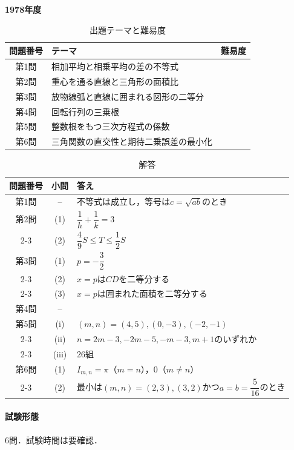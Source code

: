 \documentclass[../../main.tex]{subfiles}
\begin{document}
\begin{center}
  {\fontsize{48pt}{58pt}\selectfont \textbf{1978}\normalsize\textbf{年度}}
\end{center}

\begin{table}[htb]
  \centering
  \caption{出題テーマと難易度}
  \begin{tabular}{|c|p{9cm}|c|}
    \hline
    \textbf{問題番号} & \textbf{テーマ} & \textbf{難易度} \\
    \hline
    第1問 & 相加平均と相乗平均の差の不等式 & \\
    \hline
    第2問 & 重心を通る直線と三角形の面積比 & \\
    \hline
    第3問 & 放物線弧と直線に囲まれる図形の二等分 & \\
    \hline
    第4問 & 回転行列の三乗根 & \\
    \hline
    第5問 & 整数根をもつ三次方程式の係数 & \\
    \hline
    第6問 & 三角関数の直交性と期待二乗誤差の最小化 & \\
    \hline
  \end{tabular}
\end{table}

\begin{table}[htb]
  \centering
  \caption{解答}
  \renewcommand{\arraystretch}{1.4}
  \begin{tabular}{|c|c|p{9cm}|}
    \hline
    \textbf{問題番号} & \textbf{小問} & \textbf{答え} \\
    \hline
    第1問 & -- & 不等式は成立し，等号は$c=\sqrt{ab}$のとき \\
    \hline
    第2問 & (1) & $\dfrac{1}{h}+\dfrac{1}{k}=3$ \\
    \cline{2-3}
    & (2) & $\dfrac{4}{9}S\le T\le\dfrac{1}{2}S$ \\
    \hline
    第3問 & (1) & $p=-\dfrac{3}{2}$ \\
    \cline{2-3}
    & (2) & $x=p$は$CD$を二等分する \\
    \cline{2-3}
    & (3) & $x=p$は囲まれた面積を二等分する \\
    \hline
    第4問 & -- &  \\
    \hline
    第5問 & (i) & $(m,n)=(4,5),(0,-3),(-2,-1)$ \\
    \cline{2-3}
    & (ii) & $n=2m-3,-2m-5,-m-3,m+1$のいずれか \\
    \cline{2-3}
    & (iii) & $26$組 \\
    \hline
    第6問 & (1) & $I_{m,n}=\pi$（$m=n$），$0$（$m\ne n$） \\
    \cline{2-3}
    & (2) & 最小は$(m,n)=(2,3),(3,2)$かつ$a=b=\dfrac{5}{16}$のとき \\
    \hline
  \end{tabular}
\end{table}

\paragraph{試験形態}
6問．試験時間は要確認．
\end{document}
